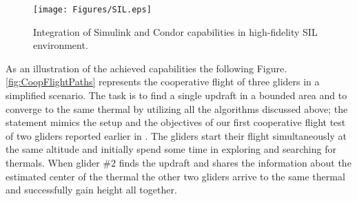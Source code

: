 \documentclass{ifacconf}
\begin{document}
\begin{figure}[thpb]
  \centering
  \texttt{[image: Figures/SIL.eps]}
  \caption{Integration of Simulink and Condor capabilities in high-fidelity SIL environment.}
  \label{fig:SIL}
\end{figure}

%
%

As an illustration of the achieved capabilities the following Figure.\ref{fig:CoopFlightPaths} represents the cooperative flight of three gliders in a simplified scenario. The task is to find a single updraft in a bounded area and to converge to the same thermal by utilizing all the algorithms discussed above; the statement mimics the setup and the objectives of our first cooperative flight test of two gliders reported earlier in \cite{AKlass_JGCD:2012}. The gliders start their flight simultaneously at the same altitude and initially spend some time in exploring and searching for thermals. When glider $\#2$ finds the updraft and shares the information about the estimated center of the thermal the other two gliders arrive to the same thermal and successfully gain height all together.
\end{document}
